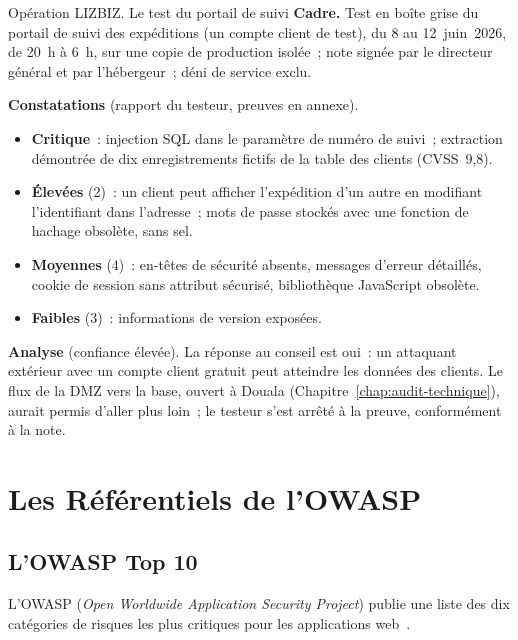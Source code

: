 \begin{boxscenario}{Opération LIZBIZ. Le test du portail de suivi}
\textbf{Cadre.} Test en boîte grise du portail de suivi des expéditions
(un compte client de test), du 8 au 12~juin~2026, de 20~h à 6~h, sur une
copie de production isolée~; note signée par le directeur général et par
l'hébergeur~; déni de service exclu.

\medskip
\textbf{Constatations} (rapport du testeur, preuves en annexe).
\begin{itemize}
    \item \textbf{Critique}~: injection SQL dans le paramètre de numéro de
          suivi~; extraction démontrée de dix enregistrements fictifs de
          la table des clients (CVSS~9,8).
    \item \textbf{Élevées} (2)~: un client peut afficher l'expédition d'un
          autre en modifiant l'identifiant dans l'adresse~; mots de passe
          stockés avec une fonction de hachage obsolète, sans sel.
    \item \textbf{Moyennes} (4)~: en-têtes de sécurité absents, messages
          d'erreur détaillés, cookie de session sans attribut sécurisé,
          bibliothèque JavaScript obsolète.
    \item \textbf{Faibles} (3)~: informations de version exposées.
\end{itemize}

\textbf{Analyse} (confiance élevée). La réponse au conseil est oui~: un
attaquant extérieur avec un compte client gratuit peut atteindre les
données des clients. Le flux de la DMZ vers la base, ouvert à Douala
(Chapitre~\ref{chap:audit-technique}), aurait permis d'aller plus loin~;
le testeur s'est arrêté à la preuve, conformément à la note.
\end{boxscenario}

\section{Les Référentiels de l'OWASP}
\label{sec:c22-owasp}

\subsection{L'OWASP Top 10}

L'OWASP (\textit{Open Worldwide Application Security Project}) publie
une liste des dix catégories de risques les plus critiques pour les
applications web~\cite{owasp2021top10}.

